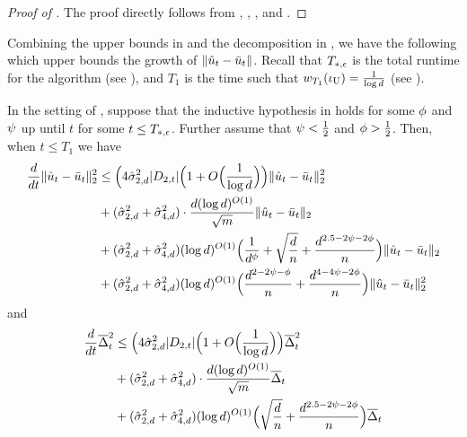\begin{proof}[Proof of ]
The proof directly follows from , , ,  and .
\end{proof}

Combining the upper bounds in  and the decomposition in , we have the following  which upper bounds the growth of $\left\lVert\hat{u}_t - \bar{u}_t\right\rVert$.
Recall that $T_{*, \epsilon}$ is the total runtime for the algorithm (see ), and $T_1$ is the time such that $w_{T_1}(\iota_{\textup{U}}) = \frac{1}{\log d}$ (see ).

\begin{lemma} \label{lemma:growth_rate_with_N}
	In the setting of , suppose that the inductive hypothesis in  holds for some $\phi$ and $\psi$ up until $t$ for some $t\le T_{*, \epsilon}$. Further assume that $\psi < \frac{1}{2}$ and $\phi > \frac{1}{2}$. Then, when $t\le T_1$ we have
\begin{align}
\frac{d}{dt} \|\hat{u}_t - \bar{u}_t\|_2^2
& \leq \Big(4 \hat{\sigma}_{2, d}^2 |D_{2, t}| \Big(1 + O\Big(\frac{1}{\log d}\Big)\Big) \|\hat{u}_t - \bar{u}_t\|_2^2 \\
& + (\hat{\sigma}_{2, d}^2 + \hat{\sigma}_{4, d}^2) \cdot \frac{d (\log d)^{O(1)}}{\sqrt{m}} \|\hat{u}_t - \bar{u}_t\|_2 \\
& + (\hat{\sigma}_{2, d}^2 + \hat{\sigma}_{4, d}^2) (\log d)^{O(1)} \Big(\frac{1}{d^{\phi}} + \sqrt{\frac{d}{n}} + \frac{d^{2.5 - 2\psi - 2\phi}}{n}\Big) \|\hat{u}_t - \bar{u}_t\|_2 \\
& + (\hat{\sigma}_{2, d}^2 + \hat{\sigma}_{4, d}^2) (\log d)^{O(1)} \Big(\frac{d^{2 - 2\psi - \phi}}{n} + \frac{d^{4 - 4\psi - 2\phi}}{n} \Big) \|\hat{u}_t - \bar{u}_t\|_2^2
\end{align}
and
\begin{align}
\frac{d}{dt} \deltaBar_t^2
& \leq \Big(4 \sigmaCoeffTwo^2 |D_{2, t}| \Big(1 + O\Big(\frac{1}{\log d}\Big)\Big) \deltaBar_t^2 \\
& + (\sigmaCoeffTwo^2 + \sigmaCoeffFour^2) \cdot \frac{d (\log d)^{O(1)}}{\sqrt{m}} \deltaBar_t \\
& + (\sigmaCoeffTwo^2 + \sigmaCoeffFour^2) (\log d)^{O(1)} \Big(\sqrt{\frac{d}{n}} + \frac{d^{2.5 - 2\maxbound - 2\avgbound}}{n}\Big) \deltaBar_t \\

\end{align}
\end{lemma}
